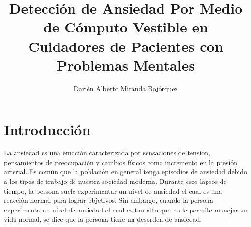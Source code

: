 \documentclass[letterpaper,12pt]{cicese}
\begin{document}
	\doublespace
	\title{Detecci\'on de Ansiedad Por Medio de C\'omputo Vestible en Cuidadores de Pacientes con Problemas Mentales}
	\author{Dari\'en Alberto Miranda Boj\'orquez}
	\maketitle
	\newpage
	\tableofcontents
	\newpage

		\chapter{Introducci\'on} 
			
			
			La ansiedad es una emoci\'on caracterizada por sensaciones de tensi\'on, pensamientos de preocupaci\'on y cambios f\'isicos como incremento en la presi\'on arterial.\citep{psychologyapa}.Es com\'un que la poblaci\'on en general tenga episodios de ansiedad debido a los tipos de trabajo de nuestra sociedad moderna. Durante esos lapsos de tiempo, la persona suele experimentar un nivel de ansiedad el cual es una reacci\'on normal para lograr objetivos. Sin embargo, cuando la persona experimenta un nivel de ansiedad el cual es tan alto que no le permite manejar su vida normal, se dice que la persona tiene un desorden de ansiedad\citep{repetto2013}.
\end{document}
